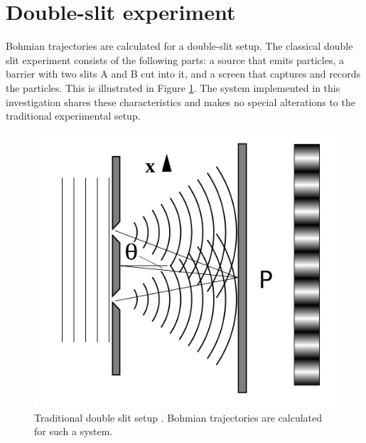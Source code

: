 \documentclass[10pt, reqno]{article}
\begin{document}
\section{Double-slit experiment}

  Bohmian trajectories are calculated for a double-slit setup.
  The classical double slit experiment consists of the following parts:
    a source that emits particles,
    a barrier with two slits A and B cut into it,
    and a screen that captures and records the particles.
  This is illustrated in Figure \ref{fig:double-slit}.
  The system implemented in this investigation shares these characteristics and makes no special alterations to the traditional experimental setup.

  \begin{figure}[!ht]
    \centerline{\includegraphics[scale=.2]{./imgs/double-slit.png}}
    \caption{
      Traditional double slit setup \cite{wiki}. 
      Bohmian trajectories are calculated for such a system.
    }
    \label{fig:double-slit}
  \end{figure}
\end{document}
